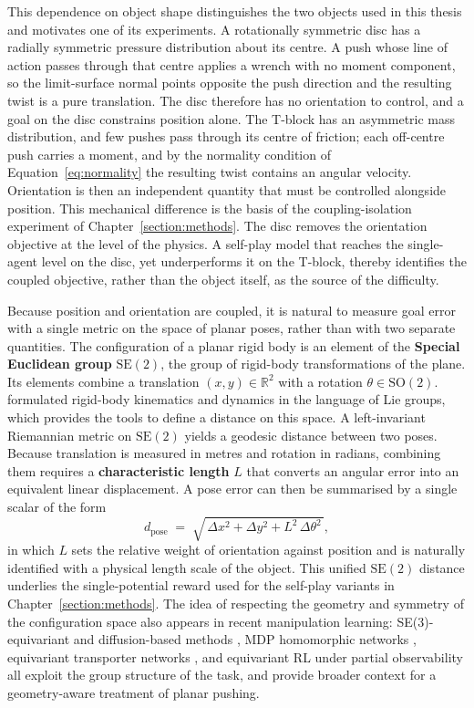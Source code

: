 This dependence on object shape distinguishes the two objects used in this thesis
and motivates one of its experiments. A rotationally symmetric disc has a radially
symmetric pressure distribution about its centre. A push whose line of action
passes through that centre applies a wrench with no moment component, so the
limit-surface normal points opposite the push direction and the resulting twist is
a pure translation. The disc therefore has no orientation to control, and a goal on
the disc constrains position alone. The T-block has an asymmetric mass
distribution, and few pushes pass through its centre of friction; each off-centre
push carries a moment, and by the normality condition of
Equation~\ref{eq:normality} the resulting twist contains an angular velocity.
Orientation is then an independent quantity that must be controlled alongside
position. This mechanical difference is the basis of the coupling-isolation
experiment of Chapter~\ref{section:methods}. The disc removes the orientation
objective at the level of the physics. A self-play model that reaches the
single-agent level on the disc, yet underperforms it on the T-block, thereby
identifies the coupled objective, rather than the object itself, as the source of
the difficulty.

Because position and orientation are coupled, it is natural to measure goal error
with a single metric on the space of planar poses, rather than with two separate
quantities. The configuration of a planar rigid body is an element of the
\textbf{Special Euclidean group} $\mathrm{SE}(2)$, the group of rigid-body
transformations of the plane. Its elements combine a translation $(x, y) \in
\mathbb{R}^2$ with a rotation $\theta \in \mathrm{SO}(2)$. \cite{Park1995LieGroup}
formulated rigid-body kinematics and dynamics in the language of Lie groups, which
provides the tools to define a distance on this space. A left-invariant Riemannian
metric on $\mathrm{SE}(2)$ yields a geodesic distance between two poses. Because
translation is measured in metres and rotation in radians, combining them requires
a \textbf{characteristic length} $L$ that converts an angular error into an
equivalent linear displacement. A pose error
can then be summarised by a single scalar of the form
\begin{equation}
    d_{\text{pose}} \;=\; \sqrt{\,\Delta x^2 + \Delta y^2 + L^2\, \Delta\theta^2\,},
    \label{eq:se2_distance}
\end{equation}
in which $L$ sets the relative weight of orientation against position and is
naturally identified with a physical length scale of the object. This unified
$\mathrm{SE}(2)$ distance underlies the single-potential reward used for the
self-play variants in Chapter~\ref{section:methods}. The idea of respecting the
geometry and symmetry of the configuration space also appears in recent
manipulation learning: SE(3)-equivariant and diffusion-based methods
\cite{Urain2023SE3Diffusion}, MDP homomorphic networks
\cite{VanderPol2020MDPHomomorphic}, equivariant transporter networks
\cite{Huang2022EquivariantTransporter}, and equivariant RL under partial
observability \cite{Nguyen2024EquivariantRL} all exploit the group structure of
the task, and provide broader context for a geometry-aware treatment of planar
pushing.


